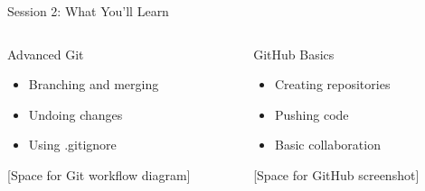 \documentclass[aspectratio=169]{beamer}
\begin{document}
\begin{frame}{Session 2: What You'll Learn}
  \begin{columns}
    \begin{column}{0.48\textwidth}
      \begin{block}{Advanced Git}
        \begin{itemize}
          \item Branching and merging
          \item Undoing changes
          \item Using .gitignore
        \end{itemize}
      \end{block}
      
      \begin{center}
        [Space for Git workflow diagram]
      \end{center}
    \end{column}
    
    \begin{column}{0.48\textwidth}
      \begin{block}{GitHub Basics}
        \begin{itemize}
          \item Creating repositories
          \item Pushing code
          \item Basic collaboration
        \end{itemize}
      \end{block}
      
      \begin{center}
        [Space for GitHub screenshot]
      \end{center}
    \end{column}
  \end{columns}
\end{frame}
\end{document}
